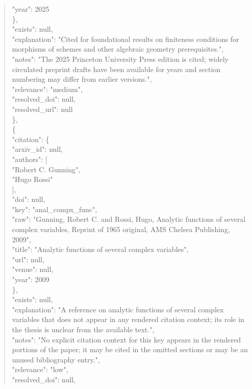 \documentclass[11pt]{article}
\begin{document}
\begin{quote}
        "year": 2025\\
      \},\\
      "exists": null,\\
      "explanation": "Cited for foundational results on finiteness conditions for morphisms of schemes and other algebraic geometry prerequisites.",\\
      "notes": "The 2025 Princeton University Press edition is cited; widely circulated preprint drafts have been available for years and section numbering may differ from earlier versions.",\\
      "relevance": "medium",\\
      "resolved\_doi": null,\\
      "resolved\_url": null\\
    \},\\
    \{\\
      "citation": \{\\
        "arxiv\_id": null,\\
        "authors": [\\
          "Robert C. Gunning",\\
          "Hugo Rossi"\\
        ],\\
        "doi": null,\\
        "key": "anal\_compx\_func",\\
        "raw": "Gunning, Robert C. and Rossi, Hugo, Analytic functions of several complex variables, Reprint of 1965 original, AMS Chelsea Publishing, 2009",\\
        "title": "Analytic functions of several complex variables",\\
        "url": null,\\
        "venue": null,\\
        "year": 2009\\
      \},\\
      "exists": null,\\
      "explanation": "A reference on analytic functions of several complex variables that does not appear in any rendered citation context; its role in the thesis is unclear from the available text.",\\
      "notes": "No explicit citation context for this key appears in the rendered portions of the paper; it may be cited in the omitted sections or may be an unused bibliography entry.",\\
      "relevance": "low",\\
      "resolved\_doi": null,\\

\end{quote}
\end{document}
